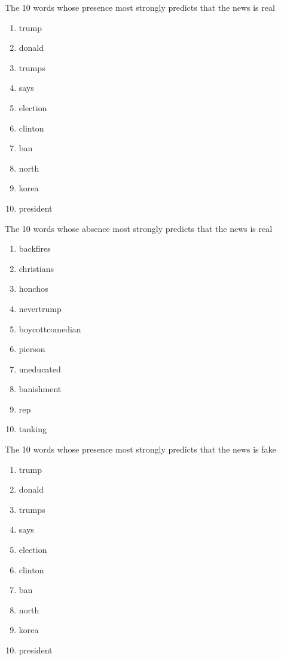 \documentclass[10pt,letterpaper]{article}
\begin{document}
\begin{enumerate}
\begin{enumerate}
			The 10 words whose presence most strongly predicts that the news is real
			\begin{enumerate}
				\item trump
				\item donald
				\item trumps
				\item says
				\item election
				\item clinton
				\item ban
				\item north
				\item korea
				\item president
			\end{enumerate}
		
			The 10 words whose absence most strongly predicts that the news is real
			\begin{enumerate}
				\item backfires
				\item christians
				\item honchos
				\item nevertrump
				\item boycottcomedian
				\item pierson
				\item uneducated
				\item banishment
				\item rep
				\item tanking
			\end{enumerate}
		
			The 10 words whose presence most strongly predicts that the news is fake
			\begin{enumerate}
				\item trump
				\item donald
				\item trumps
				\item says
				\item election
				\item clinton
				\item ban
				\item north
				\item korea
				\item president
			\end{enumerate}
		

\end{enumerate}
\end{enumerate}
\end{document}
